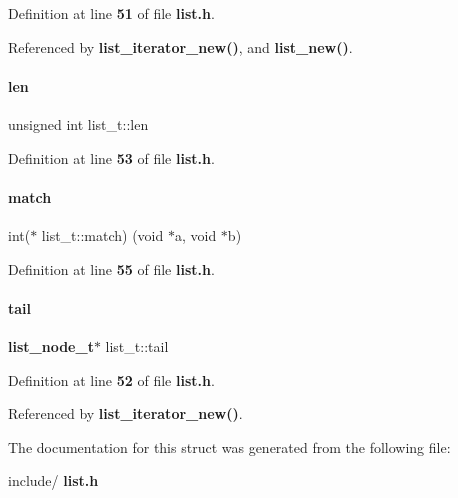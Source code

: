 Definition at line \textbf{ 51} of file \textbf{ list.\+h}.



Referenced by \textbf{ list\+\_\+iterator\+\_\+new()}, and \textbf{ list\+\_\+new()}.

\mbox{\label{structlist__t_aba275113a143fe39c162f547c6792502}} 
\paragraph{len}
{\footnotesize\ttfamily unsigned int list\+\_\+t\+::len}



Definition at line \textbf{ 53} of file \textbf{ list.\+h}.

\mbox{\label{structlist__t_a3cf6cc60206869f52386f1f72e161839}} 
\paragraph{match}
{\footnotesize\ttfamily int($\ast$ list\+\_\+t\+::match) (void $\ast$a, void $\ast$b)}



Definition at line \textbf{ 55} of file \textbf{ list.\+h}.

\mbox{\label{structlist__t_a45dc80e38f8869f66e5d006117aae5f2}} 
\paragraph{tail}
{\footnotesize\ttfamily \textbf{ list\+\_\+node\+\_\+t}$\ast$ list\+\_\+t\+::tail}



Definition at line \textbf{ 52} of file \textbf{ list.\+h}.



Referenced by \textbf{ list\+\_\+iterator\+\_\+new()}.



The documentation for this struct was generated from the following file\+:\begin{DoxyCompactItemize}
\item 
include/\textbf{ list.\+h}\end{DoxyCompactItemize}

